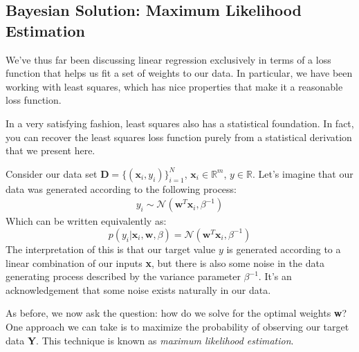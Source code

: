 \subsection{Bayesian Solution: Maximum Likelihood Estimation}
We've thus far been discussing linear regression exclusively in terms of a loss function that helps us fit a set of weights to our data. In particular, we have been working with least squares, which has nice properties that make it a reasonable loss function.

In a very satisfying fashion, least squares also has a statistical foundation. In fact, you can recover the least squares loss function purely from a statistical derivation that we present here.

Consider our data set $\textbf{D} = \{(\textbf{x}_{i}, y_{i})\}_{i = 1}^{N}$, $\textbf{x}_{i} \in\mathbb{R}^m$, $y \in\mathbb{R}$. Let's imagine that our data was generated according to the following process:
\begin{align*}
    y_{i} \sim \mathcal{N}(\textbf{w}^{T}\textbf{x}_{i}, \beta^{-1})
\end{align*}
Which can be written equivalently as:
\begin{equation} \label{normal-over-w}
    p(y_{i} | \textbf{x}_{i}, \textbf{w}, \beta) = \mathcal{N}(\textbf{w}^{T}\textbf{x}_{i}, \beta^{-1})
\end{equation}
The interpretation of this is that our target value $y$ is generated according to a linear combination of our inputs \textbf{x}, but there is also some noise in the data generating process described by the variance parameter $\beta^{-1}$. It's an acknowledgement that some noise exists naturally in our data.


As before, we now ask the question: how do we solve for the optimal weights \textbf{w}? One approach we can take is to maximize the probability of observing our target data \textbf{Y}. This technique is known as \textit{maximum likelihood estimation}.

